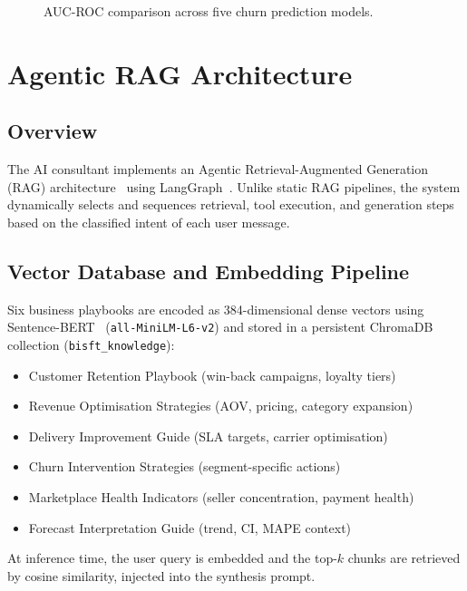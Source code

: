 \documentclass[conference]{IEEEtran}
\begin{document}
\begin{figure}[H]
\centering
{}
\caption{AUC-ROC comparison across five churn prediction models.}
\label{fig:churnbar}
\end{figure}

\section{Agentic RAG Architecture}

\subsection{Overview}

The AI consultant implements an Agentic Retrieval-Augmented Generation (RAG)
architecture~\cite{lewis2020retrieval} using LangGraph~\cite{langgraph2024}.
Unlike static RAG pipelines, the system dynamically selects and sequences retrieval,
tool execution, and generation steps based on the classified intent of each user message.

\subsection{Vector Database and Embedding Pipeline}

Six business playbooks are encoded as 384-dimensional dense vectors using
Sentence-BERT~\cite{reimers2019sentencebert} (\texttt{all-MiniLM-L6-v2}) and stored in a
persistent ChromaDB collection (\texttt{bisft\_knowledge}):
\begin{itemize}[noitemsep,topsep=2pt,leftmargin=*]
  \item Customer Retention Playbook (win-back campaigns, loyalty tiers)
  \item Revenue Optimisation Strategies (AOV, pricing, category expansion)
  \item Delivery Improvement Guide (SLA targets, carrier optimisation)
  \item Churn Intervention Strategies (segment-specific actions)
  \item Marketplace Health Indicators (seller concentration, payment health)
  \item Forecast Interpretation Guide (trend, CI, MAPE context)
\end{itemize}
At inference time, the user query is embedded and the top-$k$ chunks are retrieved by
cosine similarity, injected into the synthesis prompt.
\end{document}
